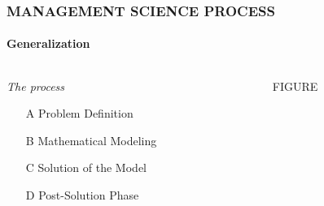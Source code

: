 \documentclass[14 pt]{beamer}
\begin{document}

\begin{frame}[t]
\frametitle{MANAGEMENT SCIENCE PROCESS}
\framesubtitle{Generalization}

\begin{columns}[t]
\begin{column}{0.45\textwidth}
\emph{The process}
\vskip0.5cm%
\begin{enumerate}
  \item[A] Problem Definition
\vskip0.5cm%
  \item[B] Mathematical Modeling
\vskip0.5cm%
  \item[C] Solution of the Model
\vskip0.5cm%
  \item[D] Post-Solution Phase
\end{enumerate}
\end{column}

\begin{column}{0.45\textwidth}
FIGURE
\end{column}
\end{columns}
\end{frame}

\end{document}
